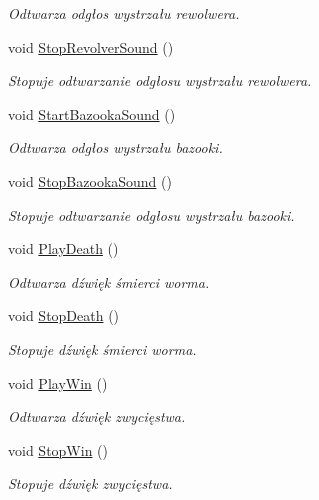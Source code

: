 \begin{DoxyCompactItemize}
\begin{DoxyCompactList}\small\item\em Odtwarza odgłos wystrzału rewolwera. \end{DoxyCompactList}\item 
void \mbox{\hyperlink{class_game_sound_a88651691b6b8e28f14e73778805bd898}{Stop\+Revolver\+Sound}} ()
\begin{DoxyCompactList}\small\item\em Stopuje odtwarzanie odgłosu wystrzału rewolwera. \end{DoxyCompactList}\item 
void \mbox{\hyperlink{class_game_sound_ab3bc96f5be15c7a9be79a035ec16638c}{Start\+Bazooka\+Sound}} ()
\begin{DoxyCompactList}\small\item\em Odtwarza odgłos wystrzału bazooki. \end{DoxyCompactList}\item 
void \mbox{\hyperlink{class_game_sound_a90742af83bd0006dba5e9a5129214c9a}{Stop\+Bazooka\+Sound}} ()
\begin{DoxyCompactList}\small\item\em Stopuje odtwarzanie odgłosu wystrzału bazooki. \end{DoxyCompactList}\item 
void \mbox{\hyperlink{class_game_sound_acd0ef105f4731da50afe47b3e02558a2}{Play\+Death}} ()
\begin{DoxyCompactList}\small\item\em Odtwarza dźwięk śmierci worma. \end{DoxyCompactList}\item 
void \mbox{\hyperlink{class_game_sound_accb7034b9c796bc9270fc3a724d18821}{Stop\+Death}} ()
\begin{DoxyCompactList}\small\item\em Stopuje dźwięk śmierci worma. \end{DoxyCompactList}\item 
void \mbox{\hyperlink{class_game_sound_a429befa039bfc4e9f7b33326fbb090a4}{Play\+Win}} ()
\begin{DoxyCompactList}\small\item\em Odtwarza dźwięk zwycięstwa. \end{DoxyCompactList}\item 
void \mbox{\hyperlink{class_game_sound_a1001607a8791e3000aff36fcc2d949f3}{Stop\+Win}} ()
\begin{DoxyCompactList}\small\item\em Stopuje dźwięk zwycięstwa. \end{DoxyCompactList}\end{DoxyCompactItemize}


